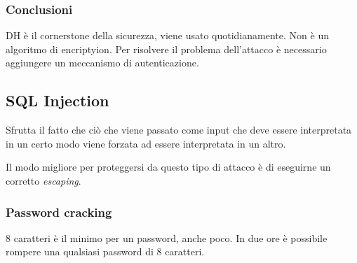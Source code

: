 \subsubsection{Conclusioni}

DH è il cornerstone della sicurezza, viene usato quotidianamente. Non è un 
algoritmo di encriptyion.
Per risolvere il problema dell'attacco è necessario aggiungere un meccanismo di 
autenticazione.

\subsection{SQL Injection}

Sfrutta il fatto che ciò che viene passato come input che deve essere 
interpretata in un certo modo viene forzata ad essere interpretata in un altro.

Il modo migliore per proteggersi da questo tipo di attacco è di eseguirne un 
corretto \textit{escaping}.

\subsubsection{Password cracking}


8 caratteri è il minimo per un password, anche poco. In due ore è possibile 
rompere una qualsiasi password di 8 caratteri.
